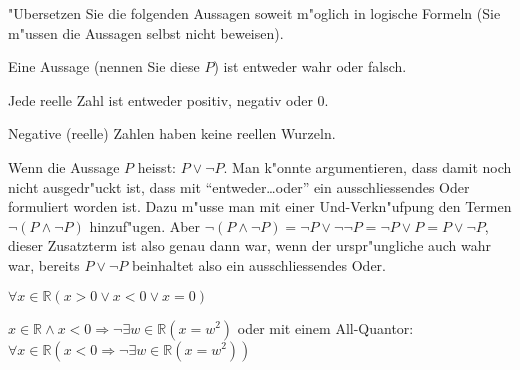 "Ubersetzen Sie die folgenden Aussagen soweit m"oglich in
logische Formeln (Sie m"ussen die Aussagen selbst nicht beweisen).
\begin{teilaufgaben}
\item Eine Aussage (nennen Sie diese $P$) ist entweder wahr oder falsch.
\item Jede reelle Zahl ist entweder positiv, negativ oder $0$.
\item Negative (reelle) Zahlen haben keine reellen Wurzeln.
\end{teilaufgaben}

\begin{loesung}
\begin{teilaufgaben}
\item Wenn die Aussage $P$ heisst: $P\vee\neg P$.
Man k"onnte argumentieren, dass damit noch nicht ausgedr"uckt ist,
dass mit ``entweder\dots oder'' ein ausschliessendes Oder formuliert
worden ist. Dazu m"usse man mit einer Und-Verkn"ufpung den Termen
$\neg(P\wedge \neg P)$
hinzuf"ugen. Aber
$\neg(P\wedge \neg P)=\neg P\vee \neg\neg P=\neg P\vee P=P\vee\neg P$,
dieser Zusatzterm ist also genau dann war, wenn der urspr"ungliche
auch wahr war, bereits $P\vee \neg P$ beinhaltet also ein ausschliessendes
Oder.
\item $\forall x\in\mathbb R(x > 0\vee x<0\vee x=0)$
\item $x\in\mathbb R\wedge x < 0\Rightarrow
\neg\exists w\in\mathbb R(x=w^2)$
oder mit einem All-Quantor: $\forall x\in\mathbb R(x<0\Rightarrow
\neg\exists w\in\mathbb R(x=w^2))$
\qedhere
\end{teilaufgaben}
\end{loesung}

